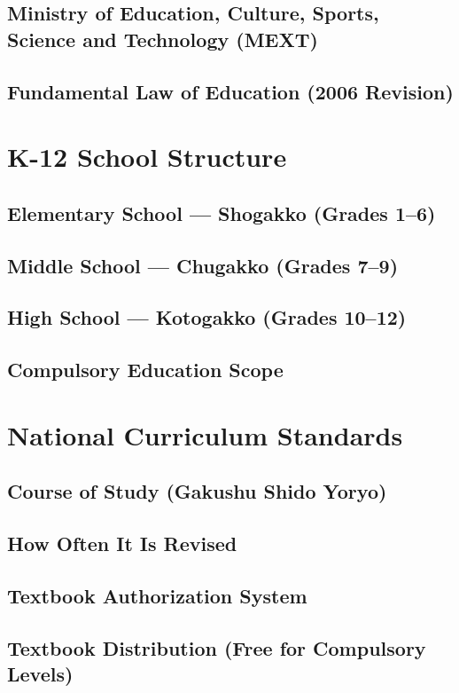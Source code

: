 \subsection{Ministry of Education, Culture, Sports, Science and Technology (MEXT)}
\subsection{Fundamental Law of Education (2006 Revision)}

\section{K-12 School Structure}
\subsection{Elementary School --- Shogakko (Grades 1--6)}
\subsection{Middle School --- Chugakko (Grades 7--9)}
\subsection{High School --- Kotogakko (Grades 10--12)}
\subsection{Compulsory Education Scope}

\section{National Curriculum Standards}
\subsection{Course of Study (Gakushu Shido Yoryo)}
\subsection{How Often It Is Revised}
\subsection{Textbook Authorization System}
\subsection{Textbook Distribution (Free for Compulsory Levels)}

